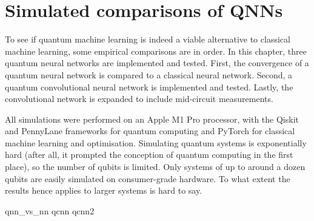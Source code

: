 \chapter{Simulated comparisons of QNNs}
\label{chap:comparison}

To see if quantum machine learning is indeed a viable alternative to classical machine learning, some empirical comparisons are in order.
In this chapter, three quantum neural networks are implemented and tested.
First, the convergence of a quantum neural network is compared to a classical neural network.
Second, a quantum convolutional neural network is implemented and tested.
Lastly, the convolutional network is expanded to include mid-circuit measurements.

All simulations were performed on an Apple M1 Pro processor, with the Qiskit \cite{qiskit} and PennyLane \cite{pennylane} frameworks for quantum computing and PyTorch \cite{pytorch} for classical machine learning and optimisation.
Simulating quantum systems is exponentially hard (after all, it prompted the conception of quantum computing in the first place), so the number of qubits is limited.
Only systems of up to around a dozen qubits are easily simulated on consumer-grade hardware.
To what extent the results hence applies to larger systems is hard to say.

{qnn_vs_nn}
{qcnn}
{qcnn2}